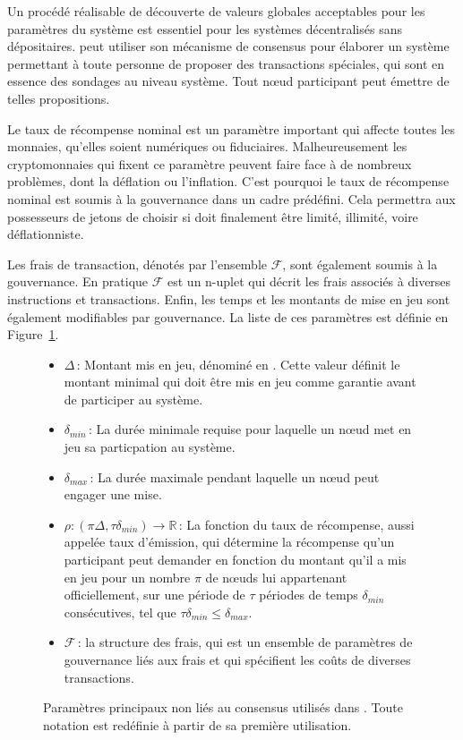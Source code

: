 \documentclass[runningheads,francais,a4paper]{llncs}
\begin{document}
Un procédé réalisable de découverte de valeurs globales acceptables pour les paramètres du système est essentiel pour les
systèmes décentralisés sans dépositaires. \AVAPlatformName{} peut utiliser son mécanisme de consensus pour élaborer un
système permettant à toute personne de proposer des transactions spéciales, qui sont en essence des sondages au niveau
système. Tout nœud participant peut émettre de telles propositions.

Le taux de récompense nominal est un paramètre important qui affecte toutes les monnaies, qu'elles soient numériques ou
fiduciaires. Malheureusement les cryptomonnaies qui fixent ce paramètre peuvent faire face à de nombreux problèmes,
dont la déflation ou l'inflation. C'est pourquoi le taux de récompense nominal est soumis à la gouvernance dans un
cadre prédéfini. Cela permettra aux possesseurs de jetons de choisir si \AVATokenName{} doit finalement être limité,
illimité, voire déflationniste.

Les frais de transaction, dénotés par l'ensemble $\mathcal{F}$, sont également soumis à la gouvernance. En pratique
$\mathcal{F}$ est un n-uplet qui décrit les frais associés à diverses instructions et transactions. Enfin, les temps
et les montants de mise en jeu sont également modifiables par gouvernance. La liste de ces paramètres est définie en
Figure~\ref{fig:notation}.

\begin{figure}[hbtp]
\begin{framed}
\begin{itemize}
\item{$\Delta$}\,: Montant mis en jeu, dénominé en \AVATokenName. Cette valeur définit le montant minimal qui doit être
mis en jeu comme garantie avant de participer au système.
\item{$\delta_{min}$}\,: La durée minimale requise pour laquelle un nœud met en jeu sa particpation au système.
\item{$\delta_{max}$}\,: La durée maximale pendant laquelle un nœud peut engager une mise.
\item{$\rho: (\pi\Delta,\tau\delta_{min}) \rightarrow \mathbb{R}$}\,: La fonction du taux de récompense, aussi appelée
taux d'émission, qui détermine la récompense qu'un participant peut demander en fonction du montant qu'il a mis en jeu
pour un nombre $\pi$ de nœuds lui appartenant officiellement, sur une période de $\tau$ périodes de temps
$\delta_{min}$ consécutives, tel que $\tau\delta_{min} \leq \delta_{max}$.
\item{$\mathcal{F}$}\,: la structure des frais, qui est un ensemble de paramètres de gouvernance liés aux frais et qui
spécifient les coûts de diverses transactions.
\end{itemize}
\end{framed}
\caption{Paramètres principaux non liés au consensus utilisés dans \AVAPlatformName{}. Toute notation est redéfinie à
partir de sa première utilisation.}
\label{fig:notation}
\end{figure}
\end{document}
